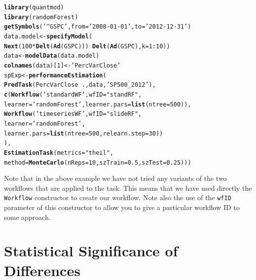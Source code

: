 \documentclass[10pt,a4paper]{article}\usepackage[]{graphicx}\usepackage[]{color}
\makeatletter
\newcommand{\hlnum}[1]{\textcolor[rgb]{0.686,0.059,0.569}{#1}}%
\newcommand{\hlstr}[1]{\textcolor[rgb]{0.192,0.494,0.8}{#1}}%
\newcommand{\hlopt}[1]{\textcolor[rgb]{0,0,0}{#1}}%
\newcommand{\hlstd}[1]{\textcolor[rgb]{0.345,0.345,0.345}{#1}}%
\newcommand{\hlkwb}[1]{\textcolor[rgb]{0.69,0.353,0.396}{#1}}%
\newcommand{\hlkwc}[1]{\textcolor[rgb]{0.333,0.667,0.333}{#1}}%
\newcommand{\hlkwd}[1]{\textcolor[rgb]{0.737,0.353,0.396}{\textbf{#1}}}%
\newenvironment{kframe}{%
 \def\at@end@of@kframe{}%
 \ifinner\ifhmode%
  \def\at@end@of@kframe{\end{minipage}}%
  \begin{minipage}{\columnwidth}%
 \fi\fi%
 \def\FrameCommand##1{\hskip\@totalleftmargin \hskip-\fboxsep
 \colorbox{shadecolor}{##1}\hskip-\fboxsep
     \hskip-\linewidth \hskip-\@totalleftmargin \hskip\columnwidth}%
 \MakeFramed {\advance\hsize-\width
   \@totalleftmargin\z@ \linewidth\hsize
   \@setminipage}}%
 {\par\unskip\endMakeFramed%
 \at@end@of@kframe}
\newenvironment{knitrout}{}{} %
\makeatother
\begin{document}
\begin{knitrout}\small
{}\color{fgcolor}\begin{kframe}
\begin{alltt}
\hlkwd{library}\hlstd{(quantmod)}
\hlkwd{library}\hlstd{(randomForest)}
\hlkwd{getSymbols}\hlstd{(}\hlstr{'^GSPC'}\hlstd{,}\hlkwc{from}\hlstd{=}\hlstr{'2008-01-01'}\hlstd{,}\hlkwc{to}\hlstd{=}\hlstr{'2012-12-31'}\hlstd{)}
\hlstd{data.model} \hlkwb{<-} \hlkwd{specifyModel}\hlstd{(}
  \hlkwd{Next}\hlstd{(}\hlnum{100}\hlopt{*}\hlkwd{Delt}\hlstd{(}\hlkwd{Ad}\hlstd{(GSPC)))} \hlopt{~} \hlkwd{Delt}\hlstd{(}\hlkwd{Ad}\hlstd{(GSPC),}\hlkwc{k}\hlstd{=}\hlnum{1}\hlopt{:}\hlnum{10}\hlstd{))}
\hlstd{data} \hlkwb{<-} \hlkwd{modelData}\hlstd{(data.model)}
\hlkwd{colnames}\hlstd{(data)[}\hlnum{1}\hlstd{]} \hlkwb{<-} \hlstr{'PercVarClose'}
\hlstd{spExp} \hlkwb{<-} \hlkwd{performanceEstimation}\hlstd{(}
  \hlkwd{PredTask}\hlstd{(PercVarClose} \hlopt{~} \hlstd{.,data,}\hlstr{'SP500_2012'}\hlstd{),}
  \hlkwd{c}\hlstd{(}\hlkwd{Workflow}\hlstd{(}\hlstr{'standardWF'}\hlstd{,}\hlkwc{wfID}\hlstd{=}\hlstr{"standRF"}\hlstd{,}
             \hlkwc{learner}\hlstd{=}\hlstr{'randomForest'}\hlstd{,}\hlkwc{learner.pars}\hlstd{=}\hlkwd{list}\hlstd{(}\hlkwc{ntree}\hlstd{=}\hlnum{500}\hlstd{)),}
    \hlkwd{Workflow}\hlstd{(}\hlstr{'timeseriesWF'}\hlstd{,}\hlkwc{wfID}\hlstd{=}\hlstr{"slideRF"}\hlstd{,}
             \hlkwc{learner}\hlstd{=}\hlstr{'randomForest'}\hlstd{,}
             \hlkwc{learner.pars}\hlstd{=}\hlkwd{list}\hlstd{(}\hlkwc{ntree}\hlstd{=}\hlnum{500}\hlstd{,}\hlkwc{relearn.step}\hlstd{=}\hlnum{30}\hlstd{))}
   \hlstd{),}
  \hlkwd{EstimationTask}\hlstd{(}\hlkwc{metrics}\hlstd{=}\hlstr{"theil"}\hlstd{,}
                 \hlkwc{method}\hlstd{=}\hlkwd{MonteCarlo}\hlstd{(}\hlkwc{nReps}\hlstd{=}\hlnum{10}\hlstd{,}\hlkwc{szTrain}\hlstd{=}\hlnum{0.5}\hlstd{,}\hlkwc{szTest}\hlstd{=}\hlnum{0.25}\hlstd{)))}
\end{alltt}
\end{kframe}
\end{knitrout}

Note that in the above example we have not tried any variants of the two workflows that are applied to the task. This means that we have used directly the \texttt{Workflow} constructor to create our workflow. Note also the use of the \texttt{wfID} parameter of this constructor to allow you to give a particular workflow ID to some approach.

\section{Statistical Significance of Differences}
\end{document}
